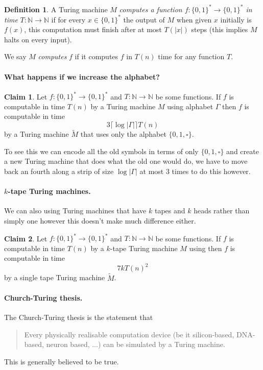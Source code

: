 \documentclass[11pt,a4paper]{article}
\theoremstyle{definition}
\newtheorem{claim}{Claim}
\newtheorem{defn}{Definition}
\newcommand{\NN}{\mathbb{N}}
\begin{document}
\begin{defn}
A Turing machine $M$ \emph{computes a function $f\colon \{0,1\}^* \to \{0,1\}^*$ in time} $T\colon \NN \to \NN$ if for every $x\in \{0,1\}^*$ the output of $M$ when given $x$ initially is $f(x)$, this computation must finish after at most $T(|x|)$ steps (this implies $M$ halts on every input).

We say $M$ \emph{computes} $f$ if it computes $f$ in $T(n)$ time for any function $T$.
\end{defn}

\paragraph{What happens if we increase the alphabet?}
\begin{claim}
Let $f\colon\{0,1\}^*\to\{0,1\}^*$ and $T\colon \NN \to \NN$ be some functions.
If $f$ is computable in time $T(n)$ by a Turing machine $M$ using alphabet $\Gamma$ then $f$ is computable in time
\[
3\lceil\log|\Gamma|\rceil T(n)
\]
by a Turing machine $\tilde{M}$ that uses only the alphabet $\{0,1,\square\}$.
\end{claim}
To see this we can encode all the old symbols in terms of only $\{0,1,\square\}$ and create a new Turing machine that does what the old one would do, we have to move back an fourth along a strip of size $\log|\Gamma|$ at most 3 times to do this however.

\paragraph{$k$-tape Turing machines.}
We can also using Turing machines that have $k$ tapes and $k$ heads rather than simply one however this doesn't make much difference either.
\begin{claim}
Let $f\colon\{0,1\}^*\to\{0,1\}^*$ and $T\colon \NN \to \NN$ be some functions.
If $f$ is computable in time $T(n)$ by a $k$-tape Turing machine $M$ using then $f$ is computable in time
\[
7kT(n)^2
\]
by a single tape Turing machine $\tilde{M}$.
\end{claim}

\paragraph{Church-Turing thesis.}
The Church-Turing thesis is the statement that
\begin{quote}
Every physically realisable computation device (be it silicon-based, DNA-based, neuron based, ...) can be simulated by a Turing machine.
\end{quote}
This is generally believed to be true.
\end{document}

